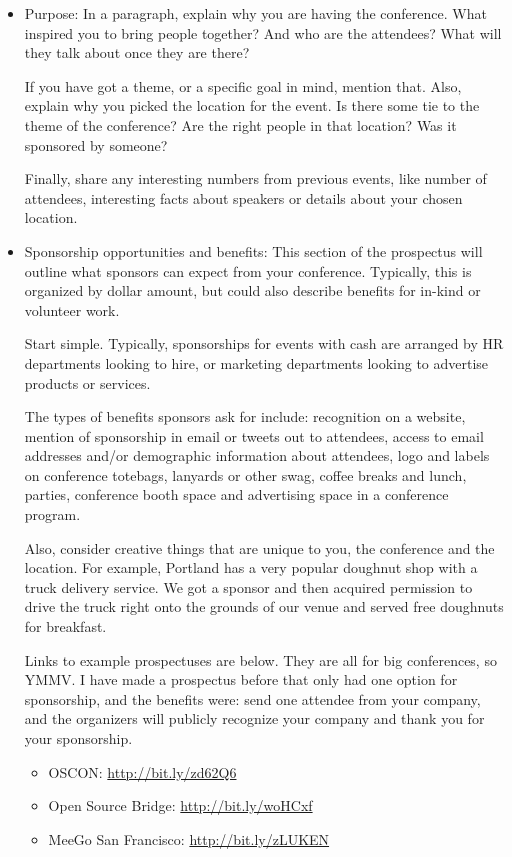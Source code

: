 \begin{itemize}
\item Purpose:
In a paragraph, explain why you are having the conference. What inspired you to
bring people together? And who are the attendees? What will they talk about once
they are there? 

If you have got a theme, or a specific goal in mind, mention that. Also, explain
why you picked the location for the event. Is there some tie to the theme of the
conference? Are the right people in that location? Was it sponsored by someone?

Finally, share any interesting numbers from previous events, like number of
attendees, interesting facts about speakers or details about your chosen
location. 

\item Sponsorship opportunities and benefits:
This section of the prospectus will outline what sponsors can expect from your
conference. Typically, this is organized by dollar amount, but could also
describe benefits for in-kind or volunteer work.

Start simple. Typically, sponsorships for events with cash are arranged by HR
departments looking to hire, or marketing departments looking to advertise
products or services. 

The types of benefits sponsors ask for include: recognition on a website,
mention of sponsorship in email or tweets out to attendees, access to email
addresses and/or demographic information about attendees, logo and labels on
conference totebags, lanyards or other swag, coffee breaks and lunch, parties,
conference booth space and advertising space in a conference program. 

Also, consider creative things that are unique to you, the conference and the
location. For example, Portland has a very popular doughnut shop with a truck
delivery service. We got a sponsor and then acquired permission to drive the
truck right onto the grounds of our venue and served free doughnuts for
breakfast.

Links to example prospectuses are below. They are all for big conferences, so
YMMV. I have made a prospectus before that
only had one option for sponsorship, and the benefits were: send one attendee
from your company, and the organizers will publicly recognize your company and 
thank you for your sponsorship.
\begin{itemize}
\item OSCON: \url{http://bit.ly/zd62Q6}
\item Open Source Bridge: \url{http://bit.ly/woHCxf}
\item MeeGo San Francisco: \url{http://bit.ly/zLUKEN}
\end{itemize}


\end{itemize}
